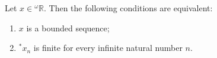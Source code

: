 Let $x \in {}^\omega\mathbb{R}$. Then the following conditions are equivalent:
\begin{enumerate}
\item[(i)] $x$ is a bounded sequence;
\item[(ii)] $^*x_n$ is finite for every infinite natural number $n$.
\end{enumerate}
